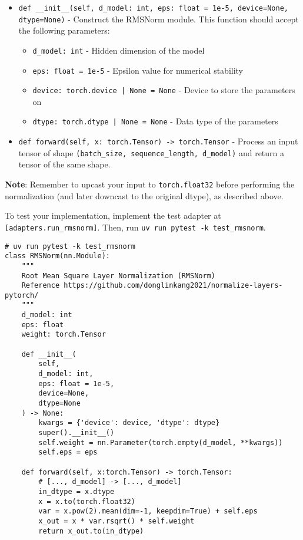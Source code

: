 \begin{itemize}
    \item \lstinline{def __init__(self, d_model: int, eps: float = 1e-5, device=None, dtype=None)} - Construct the RMSNorm module. This function should accept the following parameters:
    \begin{itemize}
        \item \lstinline{d_model: int} - Hidden dimension of the model
        \item \lstinline{eps: float = 1e-5} - Epsilon value for numerical stability
        \item \lstinline{device: torch.device | None = None} - Device to store the parameters on
        \item \lstinline{dtype: torch.dtype | None = None} - Data type of the parameters
    \end{itemize}
    
    \item \lstinline{def forward(self, x: torch.Tensor) -> torch.Tensor} - Process an input tensor of shape \lstinline{(batch_size, sequence_length, d_model)} and return a tensor of the same shape.
\end{itemize}

\textbf{Note}: Remember to upcast your input to \lstinline{torch.float32} before performing the normalization (and later downcast to the original dtype), as described above.

To test your implementation, implement the test adapter at \texttt{[adapters.run\_rmsnorm]}. Then, run \texttt{uv run pytest -k test\_rmsnorm}.

\begin{lstlisting}
# uv run pytest -k test_rmsnorm
class RMSNorm(nn.Module):
    """
    Root Mean Square Layer Normalization (RMSNorm)
    Reference https://github.com/donglinkang2021/normalize-layers-pytorch/
    """
    d_model: int
    eps: float
    weight: torch.Tensor
    
    def __init__(
        self, 
        d_model: int, 
        eps: float = 1e-5, 
        device=None, 
        dtype=None
    ) -> None:
        kwargs = {'device': device, 'dtype': dtype}
        super().__init__()
        self.weight = nn.Parameter(torch.empty(d_model, **kwargs))
        self.eps = eps

    def forward(self, x:torch.Tensor) -> torch.Tensor:
        # [..., d_model] -> [..., d_model]
        in_dtype = x.dtype
        x = x.to(torch.float32)
        var = x.pow(2).mean(dim=-1, keepdim=True) + self.eps
        x_out = x * var.rsqrt() * self.weight
        return x_out.to(in_dtype)
\end{lstlisting}

